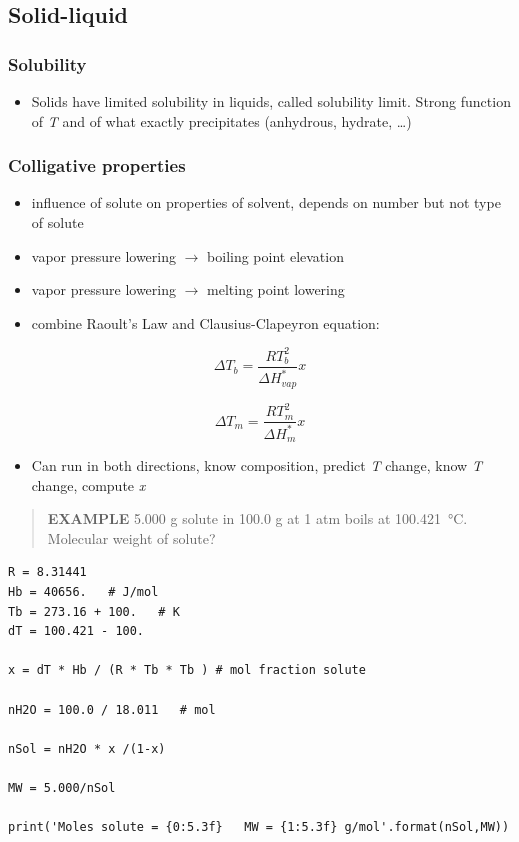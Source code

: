 \documentclass[11pt]{article}
\begin{document}
\subsection{Solid-liquid}
\label{sec-8-5}
\subsubsection{Solubility}
\label{sec-8-5-1}
\begin{itemize}
\item Solids have limited solubility in liquids, called solubility limit.  Strong function of \emph{T} and of what exactly precipitates (anhydrous, hydrate, \ldots{})
\end{itemize}
\subsubsection{Colligative properties}
\label{sec-8-5-2}
\begin{itemize}
\item influence of solute on properties of solvent, depends on number but not type of solute
\item vapor pressure lowering $\to$ boiling point elevation
\item vapor pressure lowering $\to$ melting point lowering
\item combine Raoult's Law and Clausius-Clapeyron equation:
\end{itemize}

\[\Delta T_{b} = \frac{R T_{b}^{2}}{\Delta H^{*}_{vap}}x \]

\[\Delta T_{m} = \frac{R T_{m}^{2}}{\Delta H^{*}_{m}}x \]

\begin{itemize}
\item Can run in both directions, know composition, predict \emph{T} change, know \emph{T} change, compute \emph{x}
\end{itemize}

\begin{quote}
\hline
\textbf{EXAMPLE} 5.000 g solute in 100.0 g  at 1 atm boils at \SI{100.421}{\celsius}.  Molecular weight of solute?
\hline
\end{quote}

\begin{verbatim}
R = 8.31441
Hb = 40656.   # J/mol
Tb = 273.16 + 100.   # K
dT = 100.421 - 100.

x = dT * Hb / (R * Tb * Tb ) # mol fraction solute

nH2O = 100.0 / 18.011   # mol

nSol = nH2O * x /(1-x)

MW = 5.000/nSol

print('Moles solute = {0:5.3f}   MW = {1:5.3f} g/mol'.format(nSol,MW))
\end{verbatim}
\end{document}

